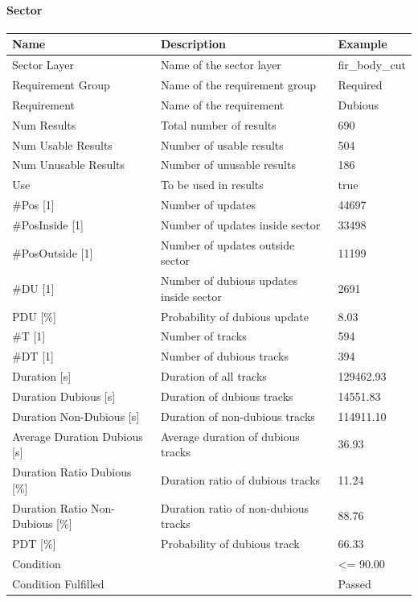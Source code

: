 \paragraph{Sector}

\begin{center}
 \begin{table}[H]
  \begin{tabularx}{\textwidth}{ | l | X |  l | }
    \hline
    \textbf{Name} & \textbf{Description} & \textbf{Example} \\ \hline
    Sector Layer & Name of the sector layer & fir\_body\_cut \\ \hline
    Requirement Group & Name of the requirement group & Required \\ \hline
    Requirement & Name of the requirement & Dubious \\ \hline
    Num Results & Total number of results & 690 \\ \hline
    Num Usable Results & Number of usable results & 504 \\ \hline
    Num Unusable Results & Number of unusable results & 186 \\ \hline
    Use & To be used in results & true \\ \hline
    \#Pos [1] & Number of updates & 44697 \\ \hline
    \#PosInside [1] & Number of updates inside sector & 33498 \\ \hline
    \#PosOutside [1] & Number of updates outside sector & 11199 \\ \hline
    \#DU [1] & Number of dubious updates inside sector & 2691 \\ \hline
    PDU [\%] & Probability of dubious update & 8.03 \\ \hline
    \#T [1] & Number of tracks & 594 \\ \hline
    \#DT [1] & Number of dubious tracks & 394 \\ \hline
    Duration [s] & Duration of all tracks & 129462.93 \\ \hline
    Duration Dubious [s] & Duration of dubious tracks & 14551.83 \\ \hline
    Duration Non-Dubious [s] & Duration of non-dubious tracks & 114911.10 \\ \hline
    Average Duration Dubious [s] & Average duration of dubious tracks & 36.93 \\ \hline
    Duration Ratio Dubious [\%] & Duration ratio of dubious tracks & 11.24 \\ \hline
    Duration Ratio Non-Dubious [\%] & Duration ratio of non-dubious tracks & 88.76 \\ \hline
    PDT [\%] & Probability of dubious track & 66.33 \\ \hline
    Condition &  & <= 90.00 \\ \hline
    Condition Fulfilled &  & Passed \\ \hline
\end{tabularx}
\end{table}
\end{center}

